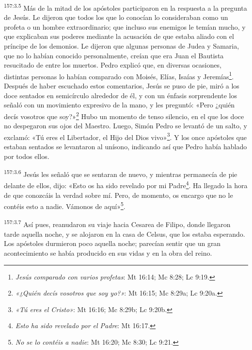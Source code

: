 \par
\textsuperscript{157:3.5} Más de la mitad de los apóstoles participaron en la respuesta a la pregunta de Jesús. Le dijeron que todos los que lo conocían lo consideraban como un profeta o un hombre extraordinario; que incluso sus enemigos le temían mucho, y que explicaban sus poderes mediante la acusación de que estaba aliado con el príncipe de los demonios. Le dijeron que algunas personas de Judea y Samaria, que no lo habían conocido personalmente, creían que era Juan el Bautista resucitado de entre los muertos. Pedro explicó que, en diversas ocasiones, distintas personas lo habían comparado con Moisés, Elías, Isaías y Jeremías\footnote{\textit{Jesús comparado con varios profetas}: Mt 16:14; Mc 8:28; Lc 9:19.}. Después de haber escuchado estos comentarios, Jesús se puso de pie, miró a los doce sentados en semicírculo alrededor de él, y con un énfasis sorprendente los señaló con un movimiento expresivo de la mano, y les preguntó: «Pero ¿quién decís vosotros que soy?»\footnote{\textit{«¿Quién decís vosotros que soy yo?»}: Mt 16:15; Mc 8:29a; Lc 9:20a.} Hubo un momento de tenso silencio, en el que los doce no despegaron sus ojos del Maestro. Luego, Simón Pedro se levantó de un salto, y exclamó: «Tú eres el Libertador, el Hijo del Dios vivo»\footnote{\textit{«Tú eres el Cristo»}: Mt 16:16; Mc 8:29b; Lc 9:20b.}. Y los once apóstoles que estaban sentados se levantaron al unísono, indicando así que Pedro había hablado por todos ellos.

\par
\textsuperscript{157:3.6} Jesús les señaló que se sentaran de nuevo, y mientras permanecía de pie delante de ellos, dijo: «Esto os ha sido revelado por mi Padre\footnote{\textit{Esto ha sido revelado por el Padre}: Mt 16:17.}. Ha llegado la hora de que conozcáis la verdad sobre mí. Pero, de momento, os encargo que no le contéis esto a nadie. Vámonos de aquí»\footnote{\textit{No se lo contéis a nadie}: Mt 16:20; Mc 8:30; Lc 9:21.}.

\par
\textsuperscript{157:3.7} Así pues, reanudaron su viaje hacia Cesarea de Filipo, donde llegaron tarde aquella noche, y se alojaron en la casa de Celsus, que los estaba esperando. Los apóstoles durmieron poco aquella noche; parecían sentir que un gran acontecimiento se había producido en sus vidas y en la obra del reino.

